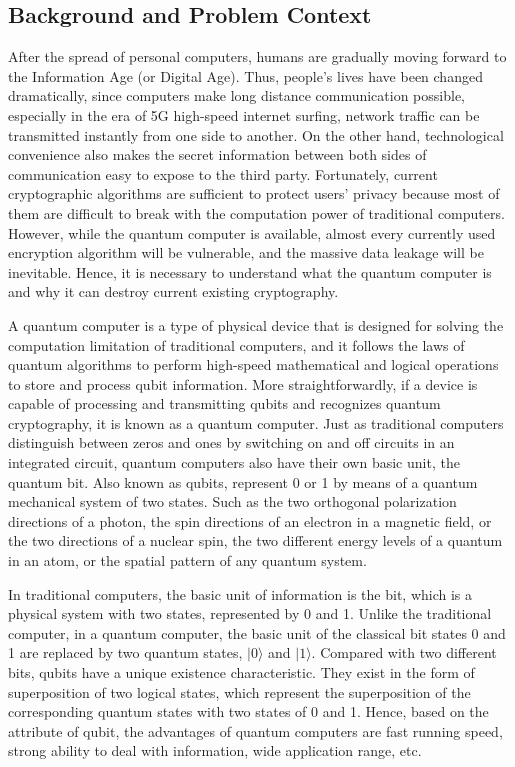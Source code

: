 \documentclass[sigconf]{acmart}
\begin{document}
\subsection{Background and Problem Context}
After the spread of personal computers, humans are gradually moving forward to the Information Age (or Digital Age). Thus, people’s lives have been changed dramatically, since computers make long distance communication possible, especially in the era of 5G high-speed internet surfing, network traffic can be transmitted instantly from one side to another. On the other hand, technological convenience also makes the secret information between both sides of communication easy to expose to the third party. Fortunately, current cryptographic algorithms are sufficient to protect users’ privacy because most of them are difficult to break with the computation power of traditional computers. However, while the quantum computer is available, almost every currently used encryption algorithm will be vulnerable, and the massive data leakage will be inevitable. Hence, it is necessary to understand what the quantum computer is and why it can destroy current existing cryptography.

A quantum computer is a type of physical device that is designed for solving the computation limitation of traditional computers, and it follows the laws of quantum algorithms to perform  high-speed mathematical and logical operations to store and process qubit information. More straightforwardly, if a device is capable of processing and transmitting qubits and recognizes quantum cryptography, it is known as a quantum computer\cite{shi_superconducting_2015}. Just as traditional computers distinguish between zeros and ones by switching on and off circuits in an integrated circuit, quantum computers also have their own basic unit, the quantum bit. Also known as qubits, represent 0 or 1 by means of a quantum mechanical system of two states. Such as the two orthogonal polarization directions of a photon, the spin directions of an electron in a magnetic field, or the two directions of a nuclear spin, the two different energy levels of a quantum in an atom, or the spatial pattern of any quantum system.

In traditional computers, the basic unit of information is the bit, which is a physical system with two states, represented by 0 and 1. Unlike the traditional computer, in a quantum computer, the basic unit of the classical bit states 0 and 1 are replaced by two quantum states, $\rvert 0\rangle$ and $\rvert 1\rangle$. Compared with two different bits, qubits have a unique existence characteristic. They exist in the form of superposition of two logical states, which represent the superposition of the corresponding quantum states with two states of 0 and 1. Hence, based on the attribute of qubit, the advantages of quantum computers are fast running speed, strong ability to deal with information, wide application range, etc.
\end{document}

